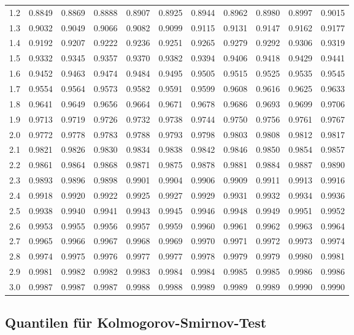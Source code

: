\begin{center}
\begin{tabular}{|r|rrrrrrrrrr|}
        1.2&0.8849&0.8869&0.8888&0.8907&0.8925&0.8944&0.8962&0.8980&0.8997&0.9015\\
        1.3&0.9032&0.9049&0.9066&0.9082&0.9099&0.9115&0.9131&0.9147&0.9162&0.9177\\
        1.4&0.9192&0.9207&0.9222&0.9236&0.9251&0.9265&0.9279&0.9292&0.9306&0.9319\\
        1.5&0.9332&0.9345&0.9357&0.9370&0.9382&0.9394&0.9406&0.9418&0.9429&0.9441\\
        1.6&0.9452&0.9463&0.9474&0.9484&0.9495&0.9505&0.9515&0.9525&0.9535&0.9545\\
        1.7&0.9554&0.9564&0.9573&0.9582&0.9591&0.9599&0.9608&0.9616&0.9625&0.9633\\
        1.8&0.9641&0.9649&0.9656&0.9664&0.9671&0.9678&0.9686&0.9693&0.9699&0.9706\\
        1.9&0.9713&0.9719&0.9726&0.9732&0.9738&0.9744&0.9750&0.9756&0.9761&0.9767\\
        2.0&0.9772&0.9778&0.9783&0.9788&0.9793&0.9798&0.9803&0.9808&0.9812&0.9817\\
        2.1&0.9821&0.9826&0.9830&0.9834&0.9838&0.9842&0.9846&0.9850&0.9854&0.9857\\
        2.2&0.9861&0.9864&0.9868&0.9871&0.9875&0.9878&0.9881&0.9884&0.9887&0.9890\\
        2.3&0.9893&0.9896&0.9898&0.9901&0.9904&0.9906&0.9909&0.9911&0.9913&0.9916\\
        2.4&0.9918&0.9920&0.9922&0.9925&0.9927&0.9929&0.9931&0.9932&0.9934&0.9936\\
        2.5&0.9938&0.9940&0.9941&0.9943&0.9945&0.9946&0.9948&0.9949&0.9951&0.9952\\
        2.6&0.9953&0.9955&0.9956&0.9957&0.9959&0.9960&0.9961&0.9962&0.9963&0.9964\\
        2.7&0.9965&0.9966&0.9967&0.9968&0.9969&0.9970&0.9971&0.9972&0.9973&0.9974\\
        2.8&0.9974&0.9975&0.9976&0.9977&0.9977&0.9978&0.9979&0.9979&0.9980&0.9981\\
        2.9&0.9981&0.9982&0.9982&0.9983&0.9984&0.9984&0.9985&0.9985&0.9986&0.9986\\
        3.0&0.9987&0.9987&0.9987&0.9988&0.9988&0.9989&0.9989&0.9989&0.9990&0.9990\\
        \hline
    \end{tabular}
\end{center}


\subsection{Quantilen für Kolmogorov-Smirnov-Test}
\label{Quantilen für Kolmogorov-Smirnov-Test}
    
